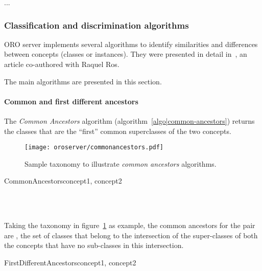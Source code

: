 ...

\subsubsection{Classification and discrimination algorithms}
\label{sect|discrimination}

ORO server implements several algorithms to identify similarities and
differences between concepts (classes or instances). They were presented in
detail in~\cite{Ros2010b}, an article co-authored with Raquel Ros.

The main algorithms are presented in this section.

\paragraph{Common and first different ancestors} The \emph{Common Ancestors}
algorithm (algorithm~\ref{algo|common-ancestors}) returns the classes that
are the ``first'' common superclasses of the two concepts.

\begin{figure}
    \centering
    \texttt{[image: oroserver/commonancestors.pdf]}
    \caption{Sample taxonomy to illustrate \emph{common ancestors} algorithms.}
    \label{fig|common-ancestors}
\end{figure}

\small
\begin{pseudocode}[ruled]{CommonAncestors}{concept1, concept2}
\label{algo|common-ancestors}

\BEGIN
{} \GETS {} \cap {} \\
\\
\END

\end{pseudocode}
\normalsize

Taking the taxonomy in figure~\ref{fig|common-ancestors} as example, the common
ancestors for the pair  are
, \ie the set of classes that belong to
the intersection of the super-classes of both the concepts that have no
sub-classes in this intersection.

\small
\begin{pseudocode}[ruled]{FirstDifferentAncestors}{concept1, concept2}
\label{algo|first-different-ancestors}

\BEGIN
{} \GETS {} \\
 \GETS {} \cup {} \\

 \\
\END

\end{pseudocode}
\normalsize

